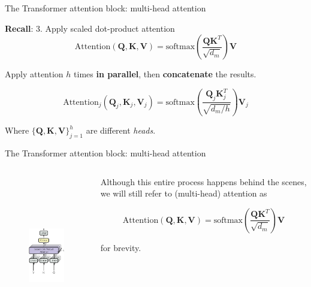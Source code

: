 \documentclass[12pt,aspectratio=169,handout]{beamer}
\begin{document}
\begin{frame}{The Transformer attention block: multi-head attention}

\textbf{Recall}: 3. Apply scaled dot-product attention
$$
	\text{Attention} (\bm{Q},\bm{K},\bm{V}) = \text{softmax} \left( \frac{\bm{Q}\bm{K}^T}{\sqrt{d_m}}\right) \bm{V} 
$$

\pause

Apply attention $h$ times \textbf{in parallel}, then \textbf{concatenate} the results.

\pause


$$
	\text{Attention}_j (\bm{Q}_j, \bm{K}_j, \bm{V}_j) = \text{softmax} \left( \frac{\bm{Q}_j \bm{K}_j^T}{ \sqrt{d_m / h} } \right) \bm{V}_j 
$$

\pause

Where $ \{ \bm{Q}, \bm{K}, \bm{V} \}^h_{j=1} $ are different \textit{heads}.

\end{frame}

\begin{frame}{The Transformer attention block: multi-head attention}

	\begin{columns}[T]
		\begin{column}{.48\textwidth}
	
			\begin{figure}[h]
				\includegraphics[height=7cm]{anno_trf_multihead}
			\end{figure}
			\end{column}
			\begin{column}{.48\textwidth}
				Although this entire process happens behind the scenes, we will still refer to (multi-head) attention as
				
				$$
					\text{Attention} (\bm{Q},\bm{K},\bm{V}) = \text{softmax} \left( \frac{\bm{Q}\bm{K}^T}{\sqrt{d_m}}\right) \bm{V} 
				$$

				for brevity.
			\end{column}
		\end{columns}

\end{frame}
\end{document}
